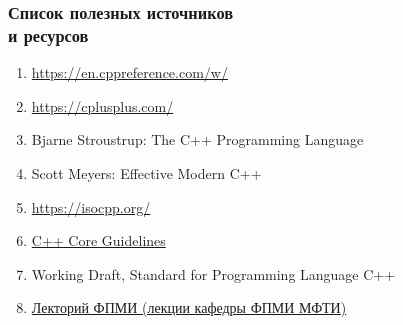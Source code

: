 \documentclass[compress, aspectratio=169]{beamer}
\begin{document}
\begin{frame}

    \frametitle{Список полезных источников \\ и ресурсов}

    \begin{enumerate}

        \item \url{https://en.cppreference.com/w/}

        \item \url{https://cplusplus.com/}

        \item Bjarne Stroustrup: The C++ Programming Language

        \item Scott Meyers: Effective Modern C++

        \item \url{https://isocpp.org/}

        \item \href{http://isocpp.github.io/CppCoreGuidelines/CppCoreGuidelines}{C++ Core Guidelines}

        \item Working Draft, Standard for Programming Language C++

        \item \href{https://www.youtube.com/@lectory\_fpmi}
            {Лекторий ФПМИ (лекции кафедры ФПМИ МФТИ)}

    \end{enumerate}

\end{frame}
\end{document}
